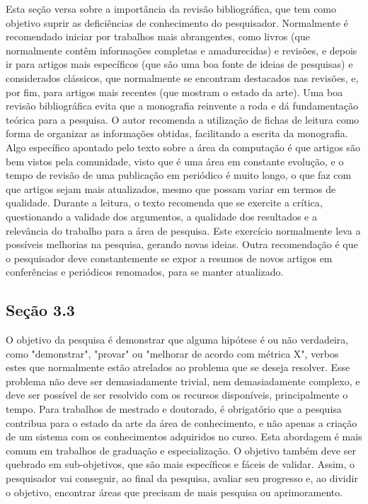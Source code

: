 \documentclass[
	12pt,				%
	openright,			%
	oneside,			%
	a4paper,			%
	chapter=TITLE,		%
	subsection=TITLE,	%
	english,			%
	brazilian,				%
	]{abntex2}
\begin{document}
Esta seção versa sobre a importância da revisão bibliográfica, que tem como objetivo suprir as deficiências de conhecimento do pesquisador.
Normalmente é recomendado iniciar por trabalhos mais abrangentes, como livros (que normalmente contêm informações completas e amadurecidas) e revisões, e depois ir para artigos mais específicos (que são uma boa fonte de ideias de pesquisas) e considerados clássicos, que normalmente se encontram destacados nas revisões, e, por fim, para artigos mais recentes (que mostram o estado da arte). Uma boa revisão bibliográfica evita que a monografia reinvente a roda e dá fundamentação teórica para a pesquisa.
O autor recomenda a utilização de fichas de leitura como forma de organizar as informações obtidas, facilitando a escrita da monografia.
Algo específico apontado pelo texto sobre a área da computação é que artigos são bem vistos pela comunidade, visto que é uma área em constante evolução, e o tempo de revisão de uma publicação em periódico é muito longo, o que faz com que artigos sejam mais atualizados, mesmo que possam variar em termos de qualidade.
Durante a leitura, o texto recomenda que se exercite a crítica, questionando a validade dos argumentos, a qualidade dos resultados e a relevância do trabalho para a área de pesquisa. Este exercício normalmente leva a possíveis melhorias na pesquisa, gerando novas ideias. Outra recomendação é que o pesquisador deve constantemente se expor a resumos de novos artigos em conferências e periódicos renomados, para se manter atualizado.

\subsection*{Seção 3.3}

O objetivo da pesquisa é demonstrar que alguma hipótese é ou não verdadeira, como "demonstrar", "provar" ou "melhorar de acordo com métrica X", verbos estes que normalmente estão atrelados ao problema que se deseja resolver. Esse problema não deve ser demasiadamente trivial, nem demasiadamente complexo, e deve ser possível de ser resolvido com os recursos disponíveis, principalmente o tempo.
Para trabalhos de mestrado e doutorado, é obrigatório que a pesquisa contribua para o estado da arte da área de conhecimento, e não apenas a criação de um sistema com os conhecimentos adquiridos no curso. Esta abordagem é mais comum em trabalhos de graduação e especialização.
O objetivo também deve ser quebrado em sub-objetivos, que são mais específicos e fáceis de validar. Assim, o pesquisador vai conseguir, ao final da pesquisa, avaliar seu progresso e, ao dividir o objetivo, encontrar áreas que precisam de mais pesquisa ou aprimoramento.
\end{document}
